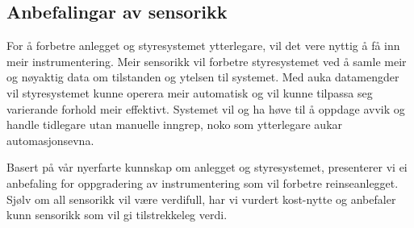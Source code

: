 \newpage

\subsection{Anbefalingar av sensorikk}

For å forbetre anlegget og styresystemet ytterlegare, vil det vere nyttig å få inn meir instrumentering. 
Meir sensorikk vil forbetre styresystemet ved å samle meir og nøyaktig data om tilstanden og ytelsen til systemet. 
Med auka datamengder vil styresystemet kunne operera meir automatisk og vil kunne tilpassa seg varierande forhold meir effektivt. 
Systemet vil og ha høve til å oppdage avvik og handle tidlegare utan manuelle inngrep, noko som ytterlegare aukar automasjonsevna.

Basert på vår nyerfarte kunnskap om anlegget og styresystemet, presenterer vi ei
anbefaling for oppgradering av instrumentering som vil forbetre reinseanlegget. 
Sjølv om all sensorikk vil være verdifull, har vi vurdert kost-nytte og anbefaler kunn sensorikk som vil gi tilstrekkeleg verdi.


